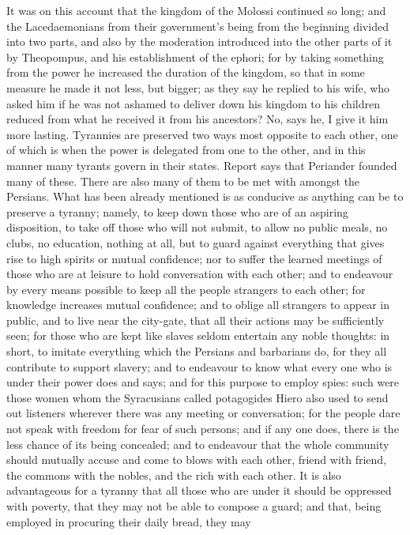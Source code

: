 It was on this account that the kingdom of the Molossi continued so long;
and the Lacedaemonians from their government's being from the beginning
divided into two parts, and also by the moderation introduced into the
other parts of it by Theopompus, and his establishment of the ephori; for
by taking something from the power he increased the duration of the
kingdom, so that in some measure he made it not less, but bigger; as they
say he replied to his wife, who asked him if he was not ashamed to deliver
down his kingdom to his children reduced from what he received it from his
ancestors? No, says he, I give it him more lasting. Tyrannies are
preserved two ways most opposite to each other, one of which is when the
power is delegated from one to the other, and in this manner many tyrants
govern in their states. Report says that Periander founded many of these.
There are also many of them to be met with amongst the Persians. What has
been already mentioned is as conducive as anything can be to preserve a
tyranny; namely, to keep down those who are of an aspiring disposition, to
take off those who will not submit, to allow no public meals, no clubs, no
education, nothing at all, but to guard against everything that gives rise
to high spirits or mutual confidence; nor to suffer the learned meetings
of those who are at leisure to hold conversation with each other; and to
endeavour by every means possible to keep all the people strangers to each
other; for knowledge increases mutual confidence; and to oblige all
strangers to appear in public, and to live near the city-gate, that all
their actions may be sufficiently seen; for those who are kept like slaves
seldom entertain any noble thoughts: in short, to imitate everything which
the Persians and barbarians do, for they all contribute to support
slavery; and to endeavour to know what every one who is under their power
does and says; and for this purpose to employ spies: such were those women
whom the Syracusians called potagogides Hiero also used to send out
listeners wherever there was any meeting or conversation; for the people
dare not speak with freedom for fear of such persons; and if any one does,
there is the less chance of its being concealed; and to endeavour that the
whole community should mutually accuse and come to blows with each other,
friend with friend, the commons with the nobles, and the rich with each
other. It is also advantageous for a tyranny that all those who are under
it should be oppressed with poverty, that they may not be able to compose
a guard; and that, being employed in procuring their daily bread, they may
